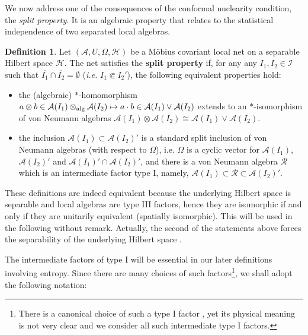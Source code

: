 \documentclass[a4paper,12pt]{article}
\theoremstyle{plain}
\theoremstyle{definition}
\newtheorem{defi}[theo]{Definition}
\theoremstyle{remark}
\def\A{{\mathcal A}}
\def\H{{\mathcal H}}
\def\R{{\mathcal R}}
\def\R{{\mathcal R}}
\begin{document}

We now address one of the consequences of the conformal nuclearity condition, the {\it split property}.
It is an algebraic property that relates to the statistical independence of two separated local algebras.

\begin{defi}%
\label{def:split}
  Let $(\A,U,\Omega,\mathcal{H})$ be a M\"obius covariant local net on a separable Hilbert space $\H$.
  The net satisfies the {\bf split property} if,
  for any any $I_1, I_2 \in \mathcal{I}$ such that $\overline{I_1} \cap \overline{I_2} = \emptyset$ ({\it i.e.} $I_1\Subset I_2'$), the following equivalent properties hold:
  \begin{itemize}
  \item the (algebraic) $*$-homomorphism $a\otimes b\in \A(I_1)\otimes_{\rm alg}\A(I_2) \mapsto a\cdot b \in \A(I_1)\vee \A(I_2)$
  extends to an $*$-isomorphism of von Neumann algebras $\A(I_1)\otimes\A(I_2) \cong \A(I_1)\vee \A(I_2)$.
  \item the inclusion $\A(I_1) \subset \A(I_2)'$ is a standard split inclusion of von Neumann algebras (with respect to $\Omega$),
  i.e.\! $\Omega$ is a cyclic vector for $\A(I_1)$, $\A(I_2)'$ and $\A(I_1)'\cap\A(I_2)'$,
  and there is a von Neumann algebra $\R$ which is an intermediate factor type I,
  namely, $\A(I_1) \subset \R \subset \A(I_2)'$.
  \end{itemize}
\end{defi}
These definitions are indeed equivalent because the underlying Hilbert space is separable
and local algebras are type III factors, hence they are isomorphic if and only if they are unitarily equivalent
(spatially isomorphic). This will be used in the following without remark.
Actually, the second of the statements above forces the separability of the underlying Hilbert space \cite[Proposition 1.6]{doplon84}.

The intermediate factors of type I will be essential in our later definitions involving entropy.
Since there are many choices of such factors\footnote{There is a canonical choice of such a type I factor \cite{doplon84},
yet its physical meaning is not very clear and we consider all such intermediate type I factors.}, we shall adopt the following notation:
\end{document}
